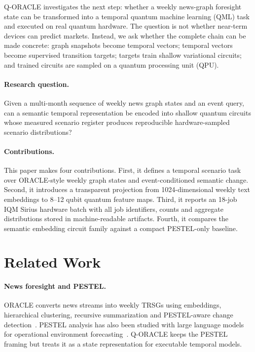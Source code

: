 \documentclass[10pt,twocolumn]{article}
\begin{document}
Q-ORACLE investigates the next step: whether a weekly news-graph foresight state can be transformed into a temporal quantum machine learning (QML) task and executed on real quantum hardware. The question is not whether near-term devices can predict markets. Instead, we ask whether the complete chain can be made concrete: graph snapshots become temporal vectors; temporal vectors become supervised transition targets; targets train shallow variational circuits; and trained circuits are sampled on a quantum processing unit (QPU).

\paragraph{Research question.}
Given a multi-month sequence of weekly news graph states and an event query, can a semantic temporal representation be encoded into shallow quantum circuits whose measured scenario register produces reproducible hardware-sampled scenario distributions?

\paragraph{Contributions.}
This paper makes four contributions. First, it defines a temporal scenario task over ORACLE-style weekly graph states and event-conditioned semantic change. Second, it introduces a transparent projection from 1024-dimensional weekly text embeddings to 8--12 qubit quantum feature maps. Third, it reports an 18-job IQM Sirius hardware batch with all job identifiers, counts and aggregate distributions stored in machine-readable artifacts. Fourth, it compares the semantic embedding circuit family against a compact PESTEL-only baseline.

\section{Related Work}
\paragraph{News foresight and PESTEL.}
ORACLE converts news streams into weekly TRSGs using embeddings, hierarchical clustering, recursive summarization and PESTEL-aware change detection~\cite{oracle2025}. PESTEL analysis has also been studied with large language models for operational environment forecasting~\cite{mlpestel2024}. Q-ORACLE keeps the PESTEL framing but treats it as a state representation for executable temporal models.
\end{document}
